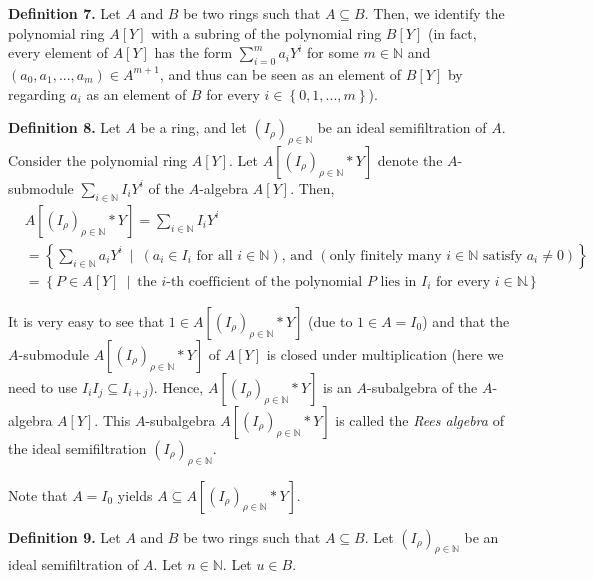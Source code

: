 \documentclass[12pt,final,notitlepage,onecolumn]{article}%
\begin{document}
\textbf{Definition 7.} Let $A$ and $B$ be two rings such that $A\subseteq B$.
Then, we identify the polynomial ring $A\left[  Y\right]  $ with a subring of
the polynomial ring $B\left[  Y\right]  $ (in fact, every element of $A\left[
Y\right]  $ has the form $\sum\limits_{i=0}^{m}a_{i}Y^{i}$ for some
$m\in\mathbb{N}$ and $\left(  a_{0},a_{1},...,a_{m}\right)  \in A^{m+1}$, and
thus can be seen as an element of $B\left[  Y\right]  $ by regarding $a_{i}$
as an element of $B$ for every $i\in\left\{  0,1,...,m\right\}  $).

\textbf{Definition 8.} Let $A$ be a ring, and let $\left(  I_{\rho}\right)
_{\rho\in\mathbb{N}}$ be an ideal semifiltration of $A$. Consider the
polynomial ring $A\left[  Y\right]  $. Let $A\left[  \left(  I_{\rho}\right)
_{\rho\in\mathbb{N}}\ast Y\right]  $ denote the $A$-submodule $\sum
\limits_{i\in\mathbb{N}}I_{i}Y^{i}$ of the $A$-algebra $A\left[  Y\right]  $.
Then,%
\begin{align*}
&  A\left[  \left(  I_{\rho}\right)  _{\rho\in\mathbb{N}}\ast Y\right]
=\sum\limits_{i\in\mathbb{N}}I_{i}Y^{i}\\
&  =\left\{  \sum_{i\in\mathbb{N}}a_{i}Y^{i}\ \mid\ \left(  a_{i}\in
I_{i}\text{ for all }i\in\mathbb{N}\right)  \text{, and }\left(  \text{only
finitely many }i\in\mathbb{N}\text{ satisfy }a_{i}\neq0\right)  \right\} \\
&  =\left\{  P\in A\left[  Y\right]  \ \mid\ \text{the }i\text{-th coefficient
of the polynomial }P\text{ lies in }I_{i}\text{ for every }i\in\mathbb{N}%
\right\}  .
\end{align*}


It is very easy to see that $1\in A\left[  \left(  I_{\rho}\right)  _{\rho
\in\mathbb{N}}\ast Y\right]  $ (due to $1\in A=I_{0}$) and that the
$A$-submodule $A\left[  \left(  I_{\rho}\right)  _{\rho\in\mathbb{N}}\ast
Y\right]  $ of $A\left[  Y\right]  $ is closed under multiplication (here we
need to use $I_{i}I_{j}\subseteq I_{i+j}$). Hence, $A\left[  \left(  I_{\rho
}\right)  _{\rho\in\mathbb{N}}\ast Y\right]  $ is an $A$-subalgebra of the
$A$-algebra $A\left[  Y\right]  $. This $A$-subalgebra $A\left[  \left(
I_{\rho}\right)  _{\rho\in\mathbb{N}}\ast Y\right]  $ is called the
\textit{Rees algebra} of the ideal semifiltration $\left(  I_{\rho}\right)
_{\rho\in\mathbb{N}}$.

Note that $A=I_{0}$ yields $A\subseteq A\left[  \left(  I_{\rho}\right)
_{\rho\in\mathbb{N}}\ast Y\right]  $.

\textbf{Definition 9.} Let $A$ and $B$ be two rings such that $A\subseteq B$.
Let $\left(  I_{\rho}\right)  _{\rho\in\mathbb{N}}$ be an ideal semifiltration
of $A$. Let $n\in\mathbb{N}$. Let $u\in B$.
\end{document}
